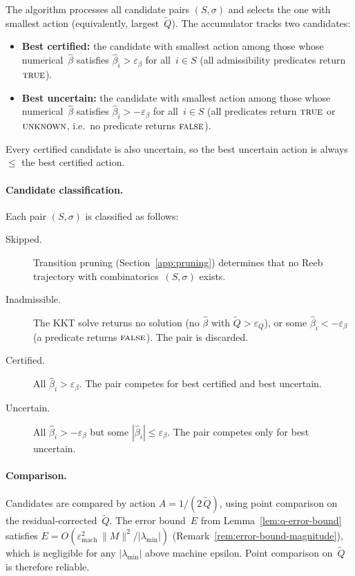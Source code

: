 
The algorithm processes all candidate pairs
$(S, \sigma)$ and selects the one with smallest
action (equivalently, largest~$\tilde Q$).
The accumulator tracks two candidates:
\begin{itemize}
\item \textbf{Best certified:}
  the candidate with smallest action among those whose
  numerical~$\hat\beta$ satisfies
  $\hat\beta_i > \varepsilon_\beta$ for all~$i \in S$
  (all admissibility predicates return $\textsc{true}$).
\item \textbf{Best uncertain:}
  the candidate with smallest action among those whose
  numerical~$\hat\beta$ satisfies
  $\hat\beta_i > -\varepsilon_\beta$ for all~$i \in S$
  (all predicates return $\textsc{true}$ or
  $\textsc{unknown}$, i.e.\ no predicate returns
  $\textsc{false}$).
\end{itemize}
Every certified candidate is also uncertain, so
the best uncertain action is always~$\leq$
the best certified action.

\paragraph{Candidate classification.}
Each pair $(S, \sigma)$ is classified as follows:
\begin{description}
\item[Skipped.]
  Transition pruning
  (Section~\ref{app:pruning})
  determines that no Reeb trajectory with
  combinatorics~$(S, \sigma)$ exists.

\item[Inadmissible.]
  The KKT solve returns no solution
  (no $\hat\beta$ with
  $\tilde Q > \varepsilon_Q$), or some
  $\hat\beta_i < -\varepsilon_\beta$
  (a predicate returns $\textsc{false}$).
  The pair is discarded.

\item[Certified.]
  All $\hat\beta_i > \varepsilon_\beta$.
  The pair competes for best certified
  and best uncertain.

\item[Uncertain.]
  All $\hat\beta_i > -\varepsilon_\beta$
  but some $|\hat\beta_i| \leq \varepsilon_\beta$.
  The pair competes only for best uncertain.
\end{description}

\paragraph{Comparison.}
Candidates are compared by action
$A = 1/(2\,\tilde Q)$,
using point comparison on the
residual-corrected~$\tilde Q$.
The error bound~$E$ from
Lemma~\ref{lem:q-error-bound} satisfies
$E = O(\varepsilon_{\mathrm{mach}}^2\,\|M\|^2
  / |\lambda_{\min}|)$
(Remark~\ref{rem:error-bound-magnitude}),
which is negligible for any
$|\lambda_{\min}|$ above machine epsilon.
Point comparison on~$\tilde Q$ is therefore reliable.

